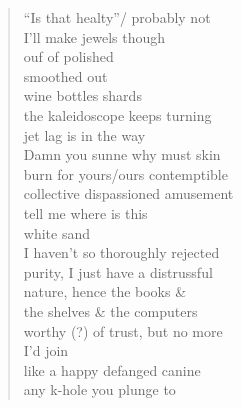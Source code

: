 \documentclass[11pt]{article}
\begin{document}
\begin{verse}
\hspace*{6em}``Is that healty''/ probably not\\
\vspace*{1em}
\hspace*{4em}I'll make jewels though\\
\hspace*{4em}ouf of polished\\
\hspace*{6em}smoothed out\\
\hspace*{8em}wine bottles shards\\
\vspace*{1em}
\hspace*{4em}the kaleidoscope keeps turning\\
\hspace*{6em}jet lag is in the way\\
\hspace*{7em}Damn you sunne why must skin\\
\hspace*{4em}burn for yours/ours contemptible\\
\hspace*{5em}collective dispassioned amusement\\
\vspace*{1em}
\hspace*{5em}tell me where is this\\
\hspace*{5em}white sand\\
\hspace*{4em}I haven't so thoroughly rejected\\
\hspace*{5em}purity, I just have a distrussful\\
\hspace*{5em}nature, hence the books \&\\
\hspace*{4em}the shelves \& the computers\\
\hspace*{5em}worthy (?) of trust, but no more\\
\hspace*{5em}I'd join\\
\hspace*{6em}like a happy defanged canine\\
\hspace*{7em}any k-hole you plunge to\\
\vspace*{1em}

\end{verse}
\end{document}
